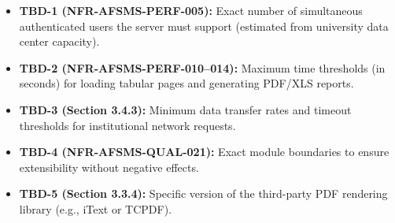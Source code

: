 \documentclass[11pt, a4paper]{article}
\begin{document}
\begin{itemize}
    \item \textbf{TBD-1 (NFR-AFSMS-PERF-005):} Exact number of simultaneous authenticated users the server must support (estimated from university data center capacity).
    \item \textbf{TBD-2 (NFR-AFSMS-PERF-010--014):} Maximum time thresholds (in seconds) for loading tabular pages and generating PDF/XLS reports.
    \item \textbf{TBD-3 (Section 3.4.3):} Minimum data transfer rates and timeout thresholds for institutional network requests.
    \item \textbf{TBD-4 (NFR-AFSMS-QUAL-021):} Exact module boundaries to ensure extensibility without negative effects.
    \item \textbf{TBD-5 (Section 3.3.4):} Specific version of the third-party PDF rendering library (e.g., iText or TCPDF).
\end{itemize}
\end{document}
